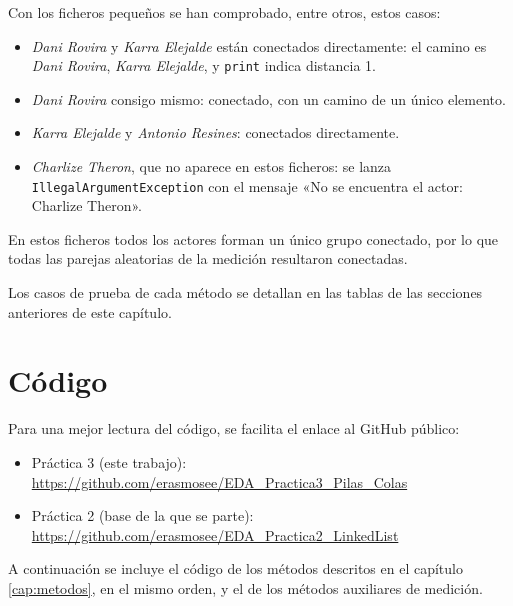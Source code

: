 \documentclass[a4paper,11pt]{report}
\begin{document}
Con los ficheros pequeños se han comprobado, entre otros, estos casos:
\begin{itemize}
    \item \textit{Dani Rovira} y \textit{Karra Elejalde} están conectados directamente: el camino es \textit{Dani Rovira}, \textit{Karra Elejalde}, y \texttt{print} indica distancia 1.
    \item \textit{Dani Rovira} consigo mismo: conectado, con un camino de un único elemento.
    \item \textit{Karra Elejalde} y \textit{Antonio Resines}: conectados directamente.
    \item \textit{Charlize Theron}, que no aparece en estos ficheros: se lanza \texttt{IllegalArgumentException} con el mensaje «No se encuentra el actor: Charlize Theron».
\end{itemize}

En estos ficheros todos los actores forman un único grupo conectado, por lo que todas las parejas aleatorias de la medición resultaron conectadas.

Los casos de prueba de cada método se detallan en las tablas de las secciones anteriores de este capítulo.

\chapter{\label{cap:codigo}Código}
Para una mejor lectura del código, se facilita el enlace al GitHub público:
\begin{itemize}
\item Práctica 3 (este trabajo): \url{https://github.com/erasmosee/EDA_Practica3_Pilas_Colas}
\item Práctica 2 (base de la que se parte): \url{https://github.com/erasmosee/EDA_Practica2_LinkedList}
\end{itemize}

A continuación se incluye el código de los métodos descritos en el capítulo \ref{cap:metodos}, en el mismo orden, y el de los métodos auxiliares de medición.
\end{document}
